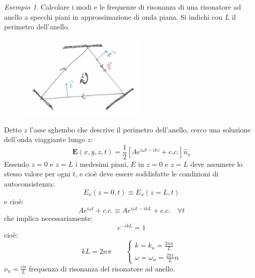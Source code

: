 \documentclass{book}
\def \*#1{\mathbf{#1}}
\theoremstyle{remark}
\newtheorem{example}{Esempio}[section]
\begin{document}
\begin{example}
Calcolare i modi e le frequenze di risonanza di una risonatore ad anello a specchi piani in approssimazione di onda piana. Si indichi con $L$ il perimetro dell'anello.
\begin{figure}[H]
\centering
\includegraphics[height=4cm]{images/13}
\end{figure}
\noindent
Detto $z$ l'asse sghembo che descrive il perimetro dell'anello, cerco una soluzione dell'onda viaggiante lungo $z$:
\begin{equation*}
\*E(x,y,z,t) = \frac{1}{2} \left[Ae^{i\omega t -ikz} + c.c. \right] \widehat{u}_x
\end{equation*}
Essendo $z=0$ e $z=L$ i medesimi piani, $E$ in $z=0$ e $z=L$ deve assumere lo stesso valore per ogni $t$, e cioè deve essere soddisfatte le condizioni di autoconsistenza:
\begin{equation*}
E_x(z=0,t) \equiv E_x(z=L, t)
\end{equation*}
e cioè:
\begin{equation*}
A e^{i\omega t} + c.c. \equiv A e^{i\omega t - ikL} + c.c. \quad \forall t
\end{equation*}
che implica necessariamente:
\begin{equation*}
e^{-ikL} = 1
\end{equation*}
cioè:
\begin{equation*}
kL = 2n\pi \qquad \begin{cases}
k = k_n = \frac{2n\pi}{L}\\
\omega = \omega_n = \frac{2\pi c}{L} n
\end{cases}
\end{equation*}
$\nu_n = \frac{cn}{L}$ frequenza di risonanza del risonatore ad anello.


\end{example}
\end{document}
